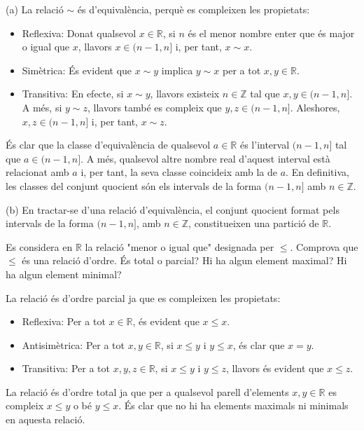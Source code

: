 \begin{solucio}
(a) La relaci\'{o} $\sim $ \'{e}s d'equival\`{e}ncia, perqu\`{e} es
compleixen les propietats:

\begin{itemize}
\item Reflexiva: Donat qualsevol $x\in \mathbb{R}$, si $n$ \'{e}s el menor
nombre enter que \'{e}s major o igual que $x$, llavors $x\in (n-1,n]$ i, per
tant, $x\sim x$.

\item Sim\`{e}trica: \'{E}s evident que $x\sim y$ implica $y\sim x$ per a
tot $x,y\in \mathbb{R}$.

\item Transitiva: En efecte, si $x\sim y$, llavors existeix $n\in \mathbb{Z}$
tal que $x,y\in (n-1,n]$. A m\'{e}s, si $y\sim z$, llavors tamb\'{e} es
compleix que $y,z\in (n-1,n]$. Aleshores, $x,z\in (n-1,n]$ i, per tant, $%
x\sim z$.
\end{itemize}

\'{E}s clar que la classe d'equival\`{e}ncia de qualsevol $a\in \mathbb{R}$
\'{e}s l'interval $(n-1,n]$ tal que $a\in (n-1,n]$. A m\'{e}s, qualsevol
altre nombre real d'aquest interval est\`{a} relacionat amb $a$ i, per tant,
la seva classe coincideix amb la de $a$. En definitiva, les classes del
conjunt quocient s\'{o}n els intervals de la forma $(n-1,n]$ amb $n\in
\mathbb{Z}$.

(b) En tractar-se d'una relaci\'{o} d'equival\`{e}ncia, el conjunt quocient
format pels intervals de la forma $(n-1,n]$, amb $n\in \mathbb{Z}$,
constitueixen una partici\'{o} de $\mathbb{R}$.
\end{solucio}

\begin{exer}
Es considera en $\mathbb{R}$ la relaci\'{o} "menor o igual que" designada
per $\leq $. Comprova que $\leq $ \'{e}s una relaci\'{o} d'ordre. \'{E}s
total o parcial? Hi ha algun element maximal? Hi ha algun element minimal?
\end{exer}

\begin{solucio}
La relaci\'{o} \'{e}s d'ordre parcial ja que es compleixen les propietats:

\begin{itemize}
\item Reflexiva: Per a tot $x\in \mathbb{R}$, \'{e}s evident que $x\leq x$.

\item Antisim\`{e}trica: Per a tot $x,y\in \mathbb{R}$, si $x\leq y$ i $%
y\leq x$, \'{e}s clar que $x=y$.

\item Transitiva: Per a tot $x,y,z\in \mathbb{R}$, si $x\leq y$ i $y\leq z$,
llavors \'{e}s evident que $x\leq z$.
\end{itemize}

La relaci\'{o} \'{e}s d'ordre total ja que per a qualsevol parell d'elements
$x,y\in \mathbb{R}$ es compleix $x\leq y$ o b\'{e} $y\leq x$. \'{E}s clar
que no hi ha elements maximals ni minimals en aquesta relaci\'{o}.
\end{solucio}

